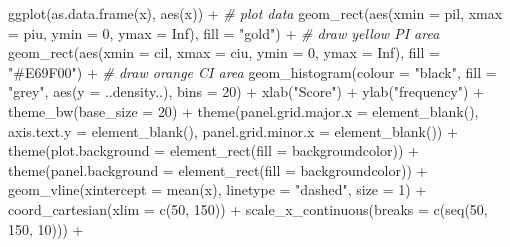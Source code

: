 \documentclass[
  oneside]{book}
\newenvironment{Shaded}{\begin{snugshade}}{\end{snugshade}}
\newcommand{\AttributeTok}[1]{\textcolor[rgb]{0.77,0.63,0.00}{#1}}
\newcommand{\CommentTok}[1]{\textcolor[rgb]{0.56,0.35,0.01}{\textit{#1}}}
\newcommand{\ConstantTok}[1]{\textcolor[rgb]{0.00,0.00,0.00}{#1}}
\newcommand{\DecValTok}[1]{\textcolor[rgb]{0.00,0.00,0.81}{#1}}
\newcommand{\FunctionTok}[1]{\textcolor[rgb]{0.00,0.00,0.00}{#1}}
\newcommand{\NormalTok}[1]{#1}
\newcommand{\SpecialCharTok}[1]{\textcolor[rgb]{0.00,0.00,0.00}{#1}}
\newcommand{\StringTok}[1]{\textcolor[rgb]{0.31,0.60,0.02}{#1}}
\begin{document}
\begin{Shaded}
\begin{Highlighting}[]
\FunctionTok{ggplot}\NormalTok{(}\FunctionTok{as.data.frame}\NormalTok{(x), }\FunctionTok{aes}\NormalTok{(x)) }\SpecialCharTok{+} \CommentTok{\# plot data}
  \FunctionTok{geom\_rect}\NormalTok{(}\FunctionTok{aes}\NormalTok{(}\AttributeTok{xmin =}\NormalTok{ pil, }\AttributeTok{xmax =}\NormalTok{ piu, }\AttributeTok{ymin =} \DecValTok{0}\NormalTok{, }\AttributeTok{ymax =} \ConstantTok{Inf}\NormalTok{),}
            \AttributeTok{fill =} \StringTok{"gold"}\NormalTok{) }\SpecialCharTok{+} \CommentTok{\# draw yellow PI area}
  \FunctionTok{geom\_rect}\NormalTok{(}\FunctionTok{aes}\NormalTok{(}\AttributeTok{xmin =}\NormalTok{ cil, }\AttributeTok{xmax =}\NormalTok{ ciu, }\AttributeTok{ymin =} \DecValTok{0}\NormalTok{, }\AttributeTok{ymax =} \ConstantTok{Inf}\NormalTok{),}
            \AttributeTok{fill =} \StringTok{"\#E69F00"}\NormalTok{) }\SpecialCharTok{+} \CommentTok{\# draw orange CI area}
  \FunctionTok{geom\_histogram}\NormalTok{(}\AttributeTok{colour =} \StringTok{"black"}\NormalTok{, }\AttributeTok{fill =} \StringTok{"grey"}\NormalTok{, }\FunctionTok{aes}\NormalTok{(}\AttributeTok{y =}\NormalTok{ ..density..), }\AttributeTok{bins =} \DecValTok{20}\NormalTok{) }\SpecialCharTok{+}
  \FunctionTok{xlab}\NormalTok{(}\StringTok{"Score"}\NormalTok{) }\SpecialCharTok{+}
  \FunctionTok{ylab}\NormalTok{(}\StringTok{"frequency"}\NormalTok{) }\SpecialCharTok{+}
  \FunctionTok{theme\_bw}\NormalTok{(}\AttributeTok{base\_size =} \DecValTok{20}\NormalTok{) }\SpecialCharTok{+}
  \FunctionTok{theme}\NormalTok{(}\AttributeTok{panel.grid.major.x =} \FunctionTok{element\_blank}\NormalTok{(), }\AttributeTok{axis.text.y =} \FunctionTok{element\_blank}\NormalTok{(),}
        \AttributeTok{panel.grid.minor.x =} \FunctionTok{element\_blank}\NormalTok{()) }\SpecialCharTok{+} 
  \FunctionTok{theme}\NormalTok{(}\AttributeTok{plot.background =} \FunctionTok{element\_rect}\NormalTok{(}\AttributeTok{fill =}\NormalTok{ backgroundcolor))  }\SpecialCharTok{+} 
  \FunctionTok{theme}\NormalTok{(}\AttributeTok{panel.background =} \FunctionTok{element\_rect}\NormalTok{(}\AttributeTok{fill =}\NormalTok{ backgroundcolor)) }\SpecialCharTok{+}
  \FunctionTok{geom\_vline}\NormalTok{(}\AttributeTok{xintercept =} \FunctionTok{mean}\NormalTok{(x), }\AttributeTok{linetype =} \StringTok{"dashed"}\NormalTok{, }\AttributeTok{size =} \DecValTok{1}\NormalTok{) }\SpecialCharTok{+}
  \FunctionTok{coord\_cartesian}\NormalTok{(}\AttributeTok{xlim =} \FunctionTok{c}\NormalTok{(}\DecValTok{50}\NormalTok{, }\DecValTok{150}\NormalTok{)) }\SpecialCharTok{+}
  \FunctionTok{scale\_x\_continuous}\NormalTok{(}\AttributeTok{breaks =} \FunctionTok{c}\NormalTok{(}\FunctionTok{seq}\NormalTok{(}\DecValTok{50}\NormalTok{, }\DecValTok{150}\NormalTok{, }\DecValTok{10}\NormalTok{))) }\SpecialCharTok{+}

\end{Highlighting}
\end{Shaded}
\end{document}
